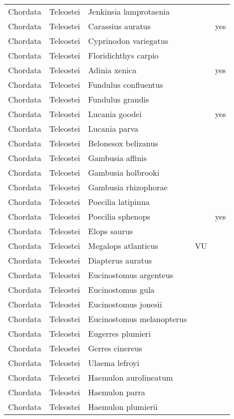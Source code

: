 \begin{longtable}{lllll}
  Chordata & Teleostei & Jenkinsia lamprotaenia &  &  \\ 
  Chordata & Teleostei & Carassius auratus &  & yes \\ 
  Chordata & Teleostei & Cyprinodon variegatus &  &  \\ 
  Chordata & Teleostei & Floridichthys carpio &  &  \\ 
  Chordata & Teleostei & Adinia xenica &  & yes \\ 
  Chordata & Teleostei & Fundulus confluentus &  &  \\ 
  Chordata & Teleostei & Fundulus grandis &  &  \\ 
  Chordata & Teleostei & Lucania goodei &  & yes \\ 
  Chordata & Teleostei & Lucania parva &  &  \\ 
  Chordata & Teleostei & Belonesox belizanus &  &  \\ 
  Chordata & Teleostei & Gambusia affinis &  &  \\ 
  Chordata & Teleostei & Gambusia holbrooki &  &  \\ 
  Chordata & Teleostei & Gambusia rhizophorae &  &  \\ 
  Chordata & Teleostei & Poecilia latipinna &  &  \\ 
  Chordata & Teleostei & Poecilia sphenops &  & yes \\ 
  Chordata & Teleostei & Elops saurus &  &  \\ 
  Chordata & Teleostei & Megalops atlanticus & VU &  \\ 
  Chordata & Teleostei & Diapterus auratus &  &  \\ 
  Chordata & Teleostei & Eucinostomus argenteus &  &  \\ 
  Chordata & Teleostei & Eucinostomus gula &  &  \\ 
  Chordata & Teleostei & Eucinostomus jonesii &  &  \\ 
  Chordata & Teleostei & Eucinostomus melanopterus &  &  \\ 
  Chordata & Teleostei & Eugerres plumieri &  &  \\ 
  Chordata & Teleostei & Gerres cinereus &  &  \\ 
  Chordata & Teleostei & Ulaema lefroyi &  &  \\ 
  Chordata & Teleostei & Haemulon aurolineatum &  &  \\ 
  Chordata & Teleostei & Haemulon parra &  &  \\ 
  Chordata & Teleostei & Haemulon plumierii &  &  \\ 

\end{longtable}
